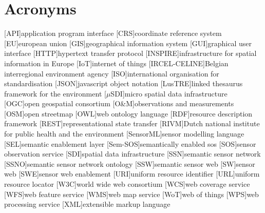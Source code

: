 
\chapter*{Acronyms}

\begin{acronym}[UML]
  [API]{application program interface}
  [CRS]{coordinate reference system} 
  [EU]{european union}
  [GIS]{geographical information system}
  [GUI]{graphical user interface}
  [HTTP]{hypertext transfer protocol}
  [INSPIRE]{infrastructure for spatial information in Europe}
  [IoT]{internet of things}
  [IRCEL-CELINE]{Belgian interregional environment agency}
  [ISO]{international organisation for standardisation}
  [JSON]{javascript object notation}
  [LusTRE]{linked thesaurus framework for the environment} 
  [$\mu$SDI]{micro spatial data infrastructure}
  [OGC]{open geospatial consortium}
  [O\&M]{observations and measurements}
  [OSM]{open streetmap}
  [OWL]{web ontology language}
  [RDF]{resource description framework}
  [REST]{representational state transfer}
  [RIVM]{Dutch national institute for public health and the environment}
  [SensorML]{sensor modelling language}
  [SEL]{semantic enablement layer}
  [Sem-SOS]{semantically enabled sos}
  [SOS]{sensor observation service}
  [SDI]{spatial data infrastructure}
  [SSN]{semantic sensor network}
  [SSNO]{semantic sensor network ontology}
  [SSW]{semantic sensor web}
  [SW]{sensor web}
  [SWE]{sensor web enablement}
  [URI]{uniform resource identifier}
  [URL]{uniform resource locator}
  [W3C]{world wide web consortium}
  [WCS]{web coverage service}
  [WFS]{web feature service}
  [WMS]{web map service}
  [WoT]{web of things}
  [WPS]{web processing service}
  [XML]{extensible markup language}
\end{acronym}